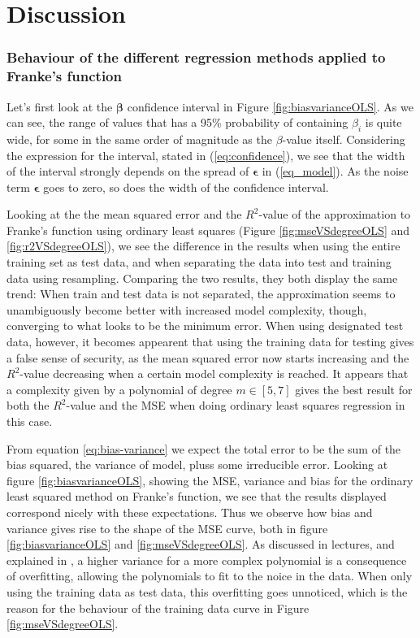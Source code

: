 \section{Discussion}
\label{sec:discussion}

\subsubsection*{Behaviour of the different regression methods applied to Franke's function}
Let's first look at the $\boldsymbol{\beta}$ confidence interval in Figure \ref{fig:biasvarianceOLS}. As we can see, the range of values that has a 95\% probability of containing $\beta_i$ is quite wide, for some in the same order of magnitude as the $\beta$-value itself. Considering the expression for the interval, stated in (\ref{eq:confidence}), we see that the width of the interval strongly depends on the spread of $\boldsymbol{\epsilon}$ in (\ref{eq_model}). As the noise term $\boldsymbol{\epsilon}$ goes to zero, so does the width of the confidence interval.  

Looking at the  the mean squared error and the $R^2$-value of the approximation to Franke's function using ordinary least squares (Figure \ref{fig:mseVSdegreeOLS} and \ref{fig:r2VSdegreeOLS}), we see the difference in the results when using the entire training set as test data, and when separating the data into test and training data using resampling. Comparing the two results, they both display the same trend: When train and test data is not separated, the approximation seems to unambiguously become better with increased model complexity, though, converging to what looks to be the minimum error. When using designated test data, however, it becomes appearent that using the training data for testing gives a false sense of security, as the mean squared error now starts increasing and the $R^2$-value decreasing when a certain model complexity is reached. It appears that a complexity given by a polynomial of degree $m \in [5,7]$ gives the best result for both the $R^2$-value and the MSE when doing ordinary least squares regression in this case.

From equation \eqref{eq:bias-variance} we expect the total error to be the sum of the bias squared, the variance of model, pluss some irreducible error. Looking at figure \ref{fig:biasvarianceOLS}, showing the MSE, variance and bias for the ordinary least squared method on Franke's function, we see that the results displayed correspond nicely with these expectations. Thus we observe how bias and variance gives rise to the shape of the MSE curve, both in figure \ref{fig:biasvarianceOLS} and \ref{fig:mseVSdegreeOLS}. As discussed in lectures, and explained in \cite{hastie2009elements}, a higher variance for a more complex polynomial is a consequence of overfitting, allowing the polynomials to fit to the noice in the data. When only using the training data as test data, this overfitting goes unnoticed, which is the reason for the behaviour of the training data curve in Figure \ref{fig:mseVSdegreeOLS}.


